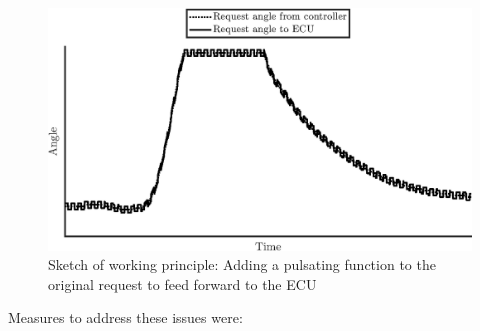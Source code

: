 \documentclass[root.tex]{subfiles}
\begin{document}
\begin{figure}[h!]
	
	\includegraphics[width=1\linewidth]{Request_with_pulse}
	\caption[Sketch of working principle: Adding a pulsating function to the original request to feed forward to the ECU]{Sketch of working principle: Adding a pulsating function to the original request to feed forward to the ECU}
	\label{fig:Request_with_pulse}
\end{figure}	
	
	Measures to address these issues were:
	
\end{document}
